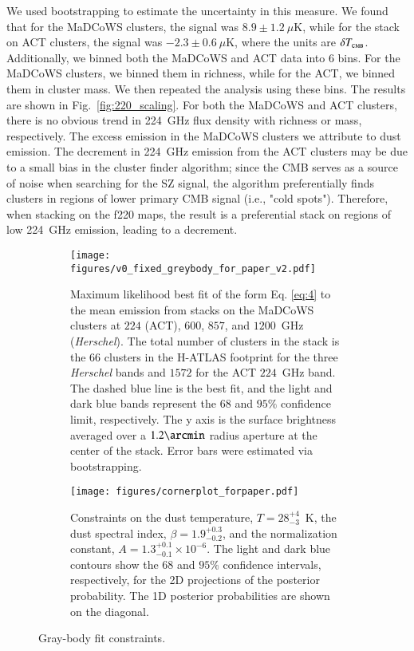 \documentclass[longauth]{aa} %
\newcommand{\madcows}{MaDCoWS\xspace}
\begin{document}
We used bootstrapping to estimate the uncertainty in this measure. We found that for the \madcows clusters, the signal was $8.9 \pm 1.2~\mu\text{K}$, while for the stack on ACT clusters, the signal was $-2.3 \pm 0.6~ \mu\text{K}$, where the units are $\delta T_\textsc{cmb}$. Additionally, we binned both the \madcows and ACT data into 6 bins. For the \madcows clusters, we binned them in richness, while for the ACT, we binned them in cluster mass. We then repeated the analysis using these bins. The results are shown in Fig.~\ref{fig:220_scaling}. For both the \madcows and ACT clusters, there is no obvious trend in 224~GHz flux density with richness or mass, respectively. The excess emission in the MaDCoWS clusters we attribute to dust emission. The decrement in 224~GHz emission from the ACT clusters may be due to a small bias in the cluster finder algorithm; since the CMB serves as a source of noise when searching for the SZ signal, the algorithm preferentially finds clusters in regions of lower primary CMB signal (i.e., "cold spots"). Therefore, when stacking on the f220 maps, the result is a preferential stack on regions of low 224~GHz emission, leading to a decrement.

\begin{figure}
    \centering
    \begin{subfigure}[b]{0.45\textwidth}
         \centering
         \texttt{[image: figures/v0\_fixed\_greybody\_for\_paper\_v2.pdf]}
         \caption{Maximum likelihood best fit of the form Eq. \ref{eq:4} to the mean emission from stacks on the MaDCoWS clusters at $224$ (ACT), $600$, $857$, and $1200$~GHz ({\it Herschel}). The total number of clusters in the stack is the $66$ clusters in the H-ATLAS footprint for the three {\it Herschel} bands and $1572$ for the ACT $224$~GHz band. The dashed blue line is the best fit, and the light and dark blue bands represent the $68$ and $95\%$ confidence limit, respectively. The y axis is the surface brightness averaged over a $1.2\arcmin$ radius aperture at the center of the stack. Error bars were estimated via bootstrapping.
         }
         \label{fig:greybody_bestfit}
     \end{subfigure}
     \hfill
     \begin{subfigure}[b]{0.45\textwidth}
         \centering
         \texttt{[image: figures/cornerplot\_forpaper.pdf]}
         \caption{Constraints on the dust temperature, $T = 28^{+4}_{-3}$~K, the dust spectral index, $\beta = 1.9^{+0.3}_{-0.2}$, and the normalization constant, $A = 1.3^{+0.1}_{-0.1}\times 10^{-6}$. The light and dark blue contours show the $68$ and $95\%$ confidence intervals, respectively, for the 2D projections of the posterior probability. The 1D posterior probabilities are shown on the diagonal.}
         \label{fig:greybody_corner}
     \end{subfigure}
        \caption{Gray-body fit constraints.}
        \label{fig:greybody}
\end{figure}
\end{document}
